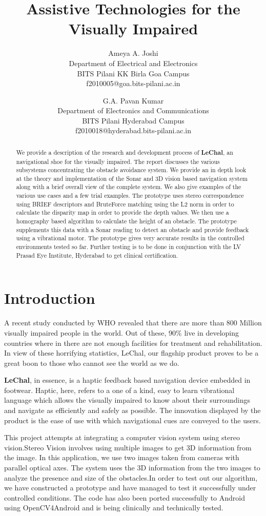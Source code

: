 \documentclass[11pt]{report}
\title{Assistive Technologies for the Visually Impaired}
\author{Ameya A. Joshi\\Department of Electrical and Electronics\\ BITS Pilani KK Birla Goa Campus\\f2010005@goa.bits-pilani.ac.in
\and
 G.A. Pavan Kumar\\
 Department of Electronics and Communications\\
 BITS Pilani Hyderabad Campus\\
 f2010018@hyderabad.bits-pilani.ac.in}
\begin{document}
\maketitle

\begin{abstract}
We provide a description of the research  and development process of \textbf{LeChal}, an navigational shoe for the visually impaired. The report discusses the various subsystems concentrating the obstacle avoidance system. We provide an in depth look at the theory and implementation of the Sonar and 3D vision based navigation system along with a brief overall view of the complete system. We also give examples of the various use cases and a few trial examples. The prototype uses stereo correspondence using BRIEF\cite{brief} descriptors and BruteForce matching using the L2 norm in order to calculate the disparity map in order to provide the depth values. We then use a homography based algorithm to calculate the height of an obstacle\cite{obstacleavoidance}. The prototype supplements this data with a Sonar reading to detect an obstacle and provide feedback using a vibrational motor. The prototype gives very accurate results in the controlled environments tested so far. Further testing is to be done in conjunction with the LV Prasad Eye Institute, Hyderabad to get clinical certification.     
\end{abstract}
\tableofcontents
\listoffigures
\listoftables
\chapter{Introduction}
A recent study conducted by WHO\cite{who} revealed that there are more than 800 Million visually impaired people in the world. Out of these, 90\% live in  developing countries 
where in there are not enough facilities for treatment and rehabilitation. In view of these horrifying statistics, LeChal\cite{lechal}, our flagship product proves to be a great boon to those who cannot see the world as we do.  

\textbf{LeChal}, in essence, is a haptic feedback based navigation device embedded in footwear. Haptic, here, refers to a one of a kind, easy to learn vibrational language which allows the visually impaired to know about their surroundings and navigate as efficiently and safely as possible. The innovation displayed by the product is the ease of use with which navigational cues are conveyed to the users. 

This project attempts at integrating a computer vision system using stereo vision.Stereo Vision\cite{gonzalez,HOGDisp} involves using multiple images to get 3D information from the image. In this application, we use two images taken from cameras with parallel optical axes. The system uses the 3D information from the two images to analyze the presence and size of the obstacles.In order to test out our algorithm, we have constructed a prototype and have managed to test it successfully under controlled conditions. The code has also been ported successfully to Android using OpenCV4Android\cite{Opencvandroid} and is being clinically and technically tested. 
\end{document}

